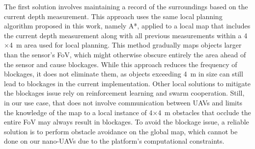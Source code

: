 The first solution involves maintaining a record of the surroundings based on the current depth measurement. 
This approach uses the same local planning algorithm proposed in this work, namely A*, applied to a local map that includes the current depth measurement along with all previous measurements within a 4$\times$\SI{4}{\meter} area used for local planning. 
This method gradually maps objects larger than the sensor’s FoV, which might otherwise obscure entirely the area ahead of the sensor and cause blockages. 
While this approach reduces the frequency of blockages, it does not eliminate them, as objects exceeding \SI{4}{\meter} in size can still lead to blockages in the current implementation.
Other local solutions to mitigate the blockages issue rely on reinforcement learning and swarm cooperation. 
Still, in our use case, that does not involve communication between UAVs and limits the knowledge of the map to a local instance of 4$\times$\SI{4}{\meter} obstacles that occlude the entire FoV may always result in blockages.
To avoid the blockage issue, a reliable solution is to perform obstacle avoidance on the global map, which cannot be done on our nano-UAVs due to the platform's computational constraints.




